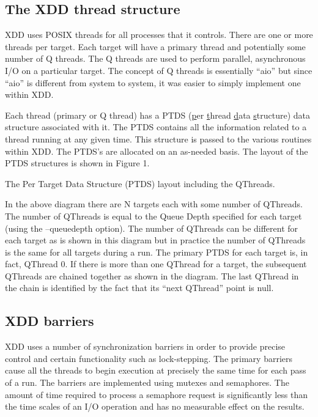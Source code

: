 \subsection{The XDD thread structure}\label{the-xdd-thread-structure}

XDD uses POSIX threads for all processes that it controls. There are one or more threads per target. Each target will have a primary thread and potentially some number of Q threads. The Q threads are used to perform parallel, asynchronous I/O on a particular target. The concept of Q threads is essentially ``aio'' but since ``aio'' is different from system to system, it was easier to simply implement one within XDD.

Each thread (primary or Q thread) has a PTDS (\ul{p}er \ul{t}hread \ul{d}ata \ul{s}tructure) data structure associated with it. The PTDS contains all the information related to a thread running at any given time. This structure is passed to the various routines within XDD. The PTDS's are allocated on an as-needed basis. The layout of the PTDS structures is shown in Figure 1.

The Per Target Data Structure (PTDS) layout including the QThreads.

In the above diagram there are N targets each with some number of QThreads. The number of QThreads is equal to the Queue Depth specified for each target (using the --queuedepth option). The number of QThreads can be different for each target as is shown in this diagram but in practice the number of QThreads is the same for all targets during a run. The primary PTDS for each target is, in fact, QThread 0. If there is more than one QThread for a target, the subsequent QThreads are chained together as shown in the diagram. The last QThread in the chain is identified by the fact that its ``next QThread'' point is null.

\subsection{XDD barriers}\label{xdd-barriers}

XDD uses a number of synchronization barriers in order to provide precise control and certain functionality such as lock-stepping. The primary barriers cause all the threads to begin execution at precisely the same time for each pass of a run. The barriers are implemented using mutexes and semaphores. The amount of time required to process a semaphore request is significantly less than the time scales of an I/O operation and has no measurable effect on the results.

